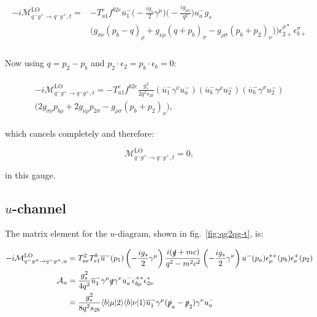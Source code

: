 			\begin{align}
			\begin{split}
				-i\mathcal{M}_{q^-g^+\to q^-g^+, t}^{\text{LO}} =
				&-T^e_{a1}f^{b2e}\overline{u}^-_1\Bigg(-\frac{ig_s}{2}\gamma^\mu\Bigg)\Bigg(-\frac{ig_{\mu\nu}}{q^2}\Bigg)u^-_ag_s\\
				&\Big(g_{\sigma\nu}(p_b-q)_\rho + g_{\nu\rho}(q+p_b)_\sigma - g_{\rho\sigma}(p_b+p_2)_\nu)\Big)\epsilon^{\rho *}_{2+}\epsilon^{\sigma}_{b+}\\
			\end{split}
			\end{align}

			Now using $q=p_2-p_b$ and $p_2\cdot\epsilon_2 = p_b\cdot\epsilon_b = 0$:

			\begin{align}
			\begin{split}
				-i\mathcal{M}_{q^-g^+\to q^-g^+, t}^{\text{LO}} =
			        -T^e_{a1}f^{b2e}\frac{g_s^2}{2q^2s_{2b}}\left(\overline{u}^-_1\gamma^{\nu}u^-_a\right)\left(\overline{u}^-_b\gamma^{\rho}u^-_2\right)\left(\overline{u}^-_b\gamma^{\sigma}u^-_2\right)\\
				\Big(2g_{\sigma\nu}p_{b\rho} + 2g_{\nu\rho}p_{2\sigma} - g_{\rho\sigma}(p_b+p_2)_\nu\Big),
			\end{split}
			\end{align}

			which cancels completely and therefore:

			\begin{equation}
				\mathcal{M}_{q^-g^+\to q^-g^+, t}^{\text{LO}}=0,
				\label{eqn:t-channel}
			\end{equation}

			in this gauge.

		\subsection{$u$-channel}

			The matrix element for the $u$-diagram, shown in fig.~\eqref{fig:qg2qg-t}, is:

			\begin{equation}
				\begin{split}
				-i\mathcal{M}_{q^-g^+\to q^-g^+, u}^{\text{LO}} &= T^2_{ae}T^b_{e1}\overline{u}^-(p_1)\left(-\frac{ig_s}{2}\gamma^\mu\right)
				\frac{i(\slashed q+mc)}{q^2-m^2c^2}\left(-\frac{ig_s}{2}\gamma^\nu\right)u^-(p_a)\epsilon_\mu^{*+}(p_b)\epsilon^+_\nu(p_2)\\
				\mathcal{A}_u &= \frac{g_s^2}{4q^2}\overline{u}^-_1\gamma^\mu\slashed q\gamma^\nu u^-_a\epsilon^{+*}_{b\mu}\epsilon^*_{2\nu}\\
				&= \frac{g_s^2}{8q^2s_{2b}}\langle b|\mu|2\rangle\langle b|\nu|1\rangle\overline{u}^-_1\gamma^\mu(\slashed{p}_a-\slashed{p}_2)\gamma^\nu u^-_a\\
				\end{split}
			\end{equation}

